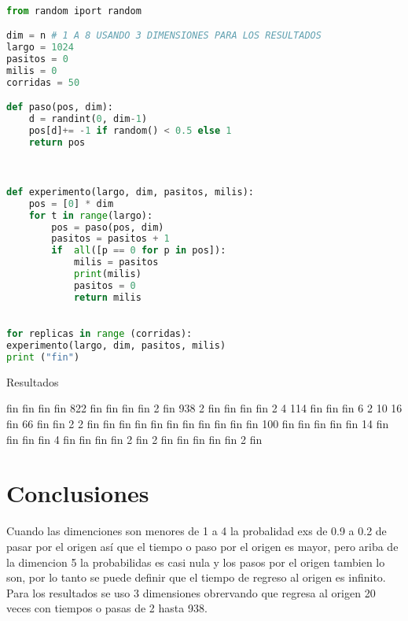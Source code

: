 \documentclass{article}
\begin{document}
\begin{lstlisting}[language=python]

from random iport random

dim = n # 1 A 8 USANDO 3 DIMENSIONES PARA LOS RESULTADOS
largo = 1024
pasitos = 0
milis = 0
corridas = 50

def paso(pos, dim):
    d = randint(0, dim-1)
    pos[d]+= -1 if random() < 0.5 else 1
    return pos

    

def experimento(largo, dim, pasitos, milis):
    pos = [0] * dim
    for t in range(largo):
        pos = paso(pos, dim)
        pasitos = pasitos + 1
        if  all([p == 0 for p in pos]):
            milis = pasitos
            print(milis)
            pasitos = 0
            return milis
  

for replicas in range (corridas):
experimento(largo, dim, pasitos, milis)
print ("fin")

\end{lstlisting}

Resultados

fin
fin
fin
fin
822
fin
fin
fin
fin
2
fin
938
2
fin
fin
fin
fin
2
4
114
fin
fin
fin
6
2
10
16
fin
66
fin
fin
2
2
fin
fin
fin
fin
fin
fin
fin
fin
fin
fin
fin
100
fin
fin
fin
fin
fin
14
fin
fin
fin
fin
4
fin
fin
fin
fin
2
fin
2
fin
fin
fin
fin
fin
2
fin


\section{Conclusiones}
Cuando las dimenciones son menores de 1 a 4 la probalidad exs de 0.9 a 0.2 de pasar por el origen as\'{i} que el tiempo o paso por el origen es mayor, pero ariba de la dimencion 5 la probabilidas es casi nula y los pasos por el origen tambien lo son, por lo tanto se puede definir que el tiempo de regreso al origen es infinito. Para los resultados se uso 3 dimensiones obrervando que regresa al origen 20 veces con tiempos o pasas de 2 hasta 938.
\end{document}
